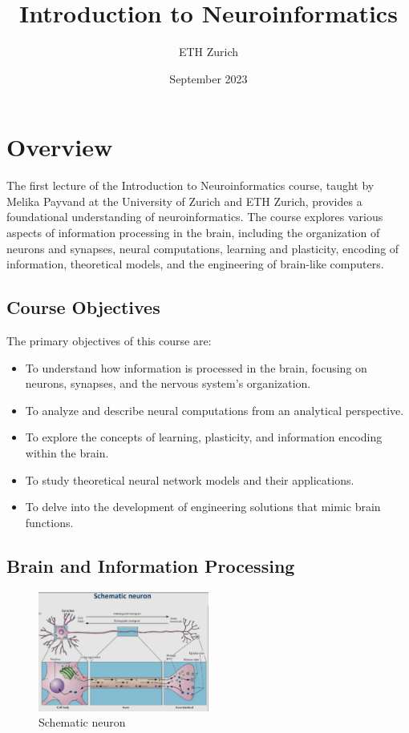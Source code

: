\documentclass{article}
\title{Introduction to Neuroinformatics}
\author{ETH Zurich}
\date{September 2023}
\begin{document}
\maketitle

\section{Overview}
The first lecture of the Introduction to Neuroinformatics course, taught by Melika Payvand at the University of Zurich and ETH Zurich, provides a foundational understanding of neuroinformatics. The course explores various aspects of information processing in the brain, including the organization of neurons and synapses, neural computations, learning and plasticity, encoding of information, theoretical models, and the engineering of brain-like computers.

\subsection{Course Objectives}
The primary objectives of this course are:
\begin{itemize}
    \item To understand how information is processed in the brain, focusing on neurons, synapses, and the nervous system's organization.
    \item To analyze and describe neural computations from an analytical perspective.
    \item To explore the concepts of learning, plasticity, and information encoding within the brain.
    \item To study theoretical neural network models and their applications.
    \item To delve into the development of engineering solutions that mimic brain functions.
\end{itemize}

\subsection{Brain and Information Processing}

\begin{figure}[H]
    \centering
    \includegraphics[width=0.5\textwidth]{assets/schematic-neuron.png}
    \caption{Schematic neuron}
    \end{figure}
    
\end{document}
